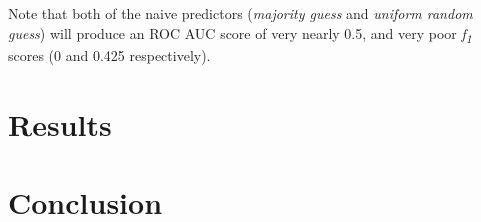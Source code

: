 \documentclass[10pt,conference]{IEEEtran}
\begin{document}
 Note that both of the naive predictors (\emph{majority guess} and \emph{uniform random guess}) will produce an ROC AUC score of very nearly 0.5, and very poor \emph{f\textsubscript{1}} scores (0 and 0.425 respectively).
 
\section{Results}


\section{Conclusion}

\nocite{*}




\vspace{12pt}
\end{document}

